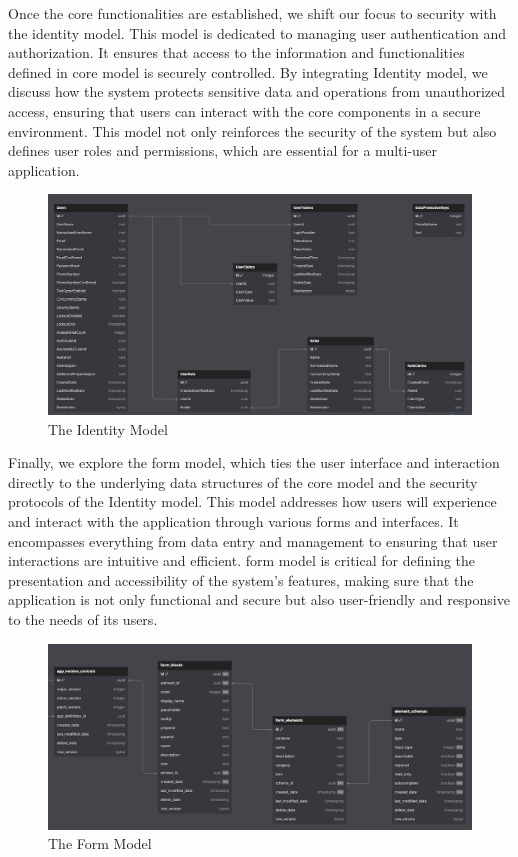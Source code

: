 Once the core functionalities are established, we shift our focus to security
with the identity model. This model is dedicated to managing user authentication and
authorization. It ensures that access to the information and functionalities
defined in core model is securely controlled. By integrating Identity model, we
discuss how the system protects sensitive data and operations from unauthorized
access, ensuring that users can interact with the core components in a secure
environment. This model not only reinforces the security of the system but also
defines user roles and permissions, which are essential for a multi-user
application. 
\begin{figure}[H]
  \centering
  \includegraphics[width=\linewidth]{Images/model_auth.png}
  \vspace{1em}
  \caption{The Identity Model}
\end{figure}

Finally, we explore the form model, which ties the user interface and
interaction directly to the underlying data structures of the core model and the
security protocols of the Identity model. This model addresses how users will
experience and interact with the application through various forms and
interfaces. It encompasses everything from data entry and management to ensuring
that user interactions are intuitive and efficient. form model is critical for
defining the presentation and accessibility of the system’s features, making
sure that the application is not only functional and secure but also
user-friendly and responsive to the needs of its users.
\begin{figure}[H]
  \centering
  \includegraphics[width=\linewidth]{Images/model_form.png}
  \vspace{1em}
  \caption{The Form Model}
\end{figure}

